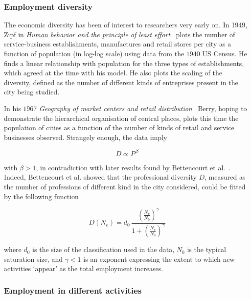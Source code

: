 \subsubsection{Employment diversity}
\label{ssub:employment_diversity}

The economic diversity has been of interest to researchers very early on. In
1949, Zipf in \emph{Human behavior and the principle of least
effort}~\cite{Zipf:1949} plots the number of service-business establishments, manufactures and
retail stores per city as a function of population (in log-log scale) using data
from the $1940$ US Census. He finds a linear relationship with population for
the three types of establishments, which agreed at the time with his model. He
also plots the scaling of the diversity, defined as the number of different kinds of
entreprises present in the city being studied. 

In his $1967$ \emph{Geography of market centers and retail
distribution}~\cite{Berry:1967} Berry, hoping to demonstrate the hierarchical
organisation of central places, plots this time the population of cities as a
function of the number of kinds of retail and service businesses observed.
Strangely enough, the data imply

\begin{equation}
    D \propto P^{\, \beta}
\end{equation}

with $\beta > 1$, in contradiction with later results found by Bettencourt et
al.~\cite{Bettencourt:2014}.\\

Indeed, Bettencourt et al.\cite{Bettencourt:2014} showed that the professional
diversity $D$, measured as the number of professions of different kind in the
city considered, could be fitted by the following function

\begin{equation}
    D(N_e) = d_0\, \frac{\left(\frac{N_e}{N_0}\right)^\gamma}{1+\left(\frac{N_e}{N_0}\right)^\gamma}
\end{equation}

where $d_0$ is the size of the classification used in the data, $N_0$ is the
typical saturation size, and $\gamma < 1$ is an exponent expressing the extent to
which new activities `appear' as the total employment increases. 

\subsubsection{Employment in different activities}
\label{ssub:employment_in_different_activities}

